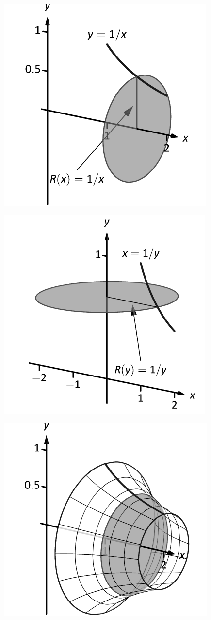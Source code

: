 \documentclass[10pt]{article}
\begin{document}
\includegraphics{figdisk1_3DBW.pdf}
\texttt{}

\includegraphics{figdisk1a_3DBW.pdf}
\texttt{}

\includegraphics{figdisk1b_3DBW.pdf}
\texttt{}
\end{document}
